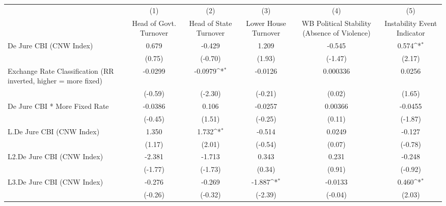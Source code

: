 {
\def\sym#1{\ifmmode^{#1}\else\(^{#1}\)\fi}
\begin{tabular*}{\linewidth}{@{\hskip\tabcolsep\extracolsep\fill}l*{5}{c}}
\hline\hline
                &\multicolumn{1}{c}{(1)}&\multicolumn{1}{c}{(2)}&\multicolumn{1}{c}{(3)}&\multicolumn{1}{c}{(4)}&\multicolumn{1}{c}{(5)}\\
                &\multicolumn{1}{c}{Head of Govt. Turnover}&\multicolumn{1}{c}{Head of State Turnover}&\multicolumn{1}{c}{Lower House Turnover}&\multicolumn{1}{c}{WB Political Stability (Absence of Violence)}&\multicolumn{1}{c}{Instability Event Indicator}\\
\hline
De Jure CBI (CNW Index)&    0.679         &   -0.429         &    1.209         &   -0.545         &    0.574\sym{*}  \\
                &   (0.75)         &  (-0.70)         &   (1.93)         &  (-1.47)         &   (2.17)         \\
[1em]
Exchange Rate Classification (RR inverted, higher = more fixed)&  -0.0299         &  -0.0979\sym{*}  &  -0.0126         & 0.000336         &   0.0256         \\
                &  (-0.59)         &  (-2.30)         &  (-0.21)         &   (0.02)         &   (1.65)         \\
[1em]
De Jure CBI * More Fixed Rate&  -0.0386         &    0.106         &  -0.0257         &  0.00366         &  -0.0455         \\
                &  (-0.45)         &   (1.51)         &  (-0.25)         &   (0.11)         &  (-1.87)         \\
[1em]
L.De Jure CBI (CNW Index)&    1.350         &    1.732\sym{*}  &   -0.514         &   0.0249         &   -0.127         \\
                &   (1.17)         &   (2.01)         &  (-0.54)         &   (0.07)         &  (-0.78)         \\
[1em]
L2.De Jure CBI (CNW Index)&   -2.381         &   -1.713         &    0.343         &    0.231         &   -0.248         \\
                &  (-1.77)         &  (-1.73)         &   (0.34)         &   (0.91)         &  (-0.92)         \\
[1em]
L3.De Jure CBI (CNW Index)&   -0.276         &   -0.269         &   -1.887\sym{*}  &  -0.0133         &    0.460\sym{*}  \\
                &  (-0.26)         &  (-0.32)         &  (-2.39)         &  (-0.04)         &   (2.03)         \\

\end{tabular*}}
